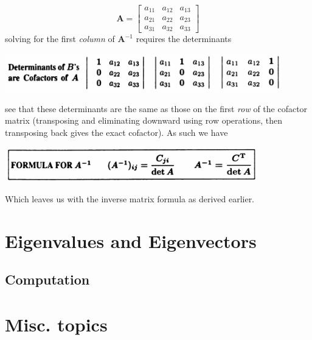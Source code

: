 \documentclass{report}
\begin{document}
\begin{equation*}
\bm A=\left[\begin{array}{ccc}
a_{11}&a_{12}&a_{13}\\
a_{21}&a_{22}&a_{23}\\
a_{31}&a_{32}&a_{33}
\end{array}\right]
\end{equation*}
solving for the first \textit{column} of $\bm A^{-1}$ requires the determinants
\begin{center}
\includegraphics[width=12cm]{108}
\end{center}
see that these determinants are the same as those on the first \textit{row} of the cofactor matrix 
(transposing and eliminating downward using row operations, then transposing back gives the exact cofactor). As such we have
\begin{center}
\includegraphics[width=11cm]{109}
\end{center}
Which leaves us with the inverse matrix formula as derived earlier.
\newpage

\chapter{Eigenvalues and Eigenvectors}
\section{Computation}






\newpage



\appendix
\chapter{Misc. topics}
\end{document}
